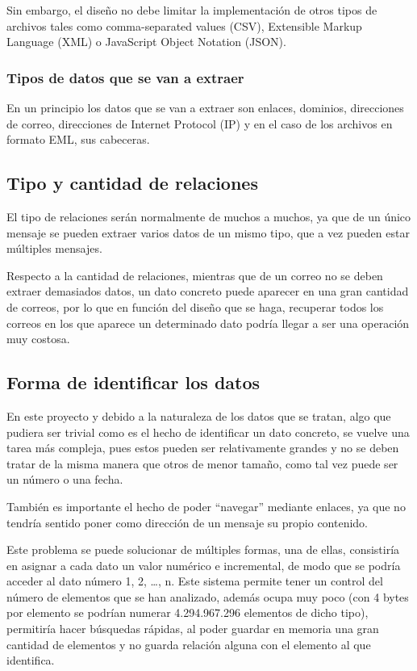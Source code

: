 Sin embargo, el diseño no debe limitar la implementación de otros tipos de archivos tales como comma-separated values (CSV), Extensible Markup Language (XML) o JavaScript Object Notation (JSON). 

\subsubsection{Tipos de datos que se van a extraer}
En un principio los datos que se van a extraer son enlaces, dominios, direcciones de correo, direcciones de Internet Protocol (IP) y en el caso de los archivos en formato EML, sus cabeceras. 

\subsection{Tipo y cantidad de relaciones}
El tipo de relaciones serán normalmente de muchos a muchos, ya que de un único mensaje se pueden extraer varios datos de un mismo tipo, que a vez pueden estar múltiples mensajes.

Respecto a la cantidad de relaciones, mientras que de un correo no se deben extraer demasiados datos, un dato concreto puede aparecer en una gran cantidad de correos, por lo que en función del diseño que se haga, recuperar todos los correos en los que aparece un determinado dato podría llegar a ser una operación muy costosa. 

\subsection{Forma de identificar los datos}
En este proyecto y debido a la naturaleza de los datos que se tratan, algo que pudiera ser trivial como es el hecho de identificar un dato concreto, se vuelve una tarea más compleja, pues estos pueden ser relativamente grandes y no se deben tratar de la misma manera que otros de menor tamaño, como tal vez puede ser un número o una fecha. 

También es importante el hecho de poder “navegar” mediante enlaces, ya que no tendría sentido poner como dirección de un mensaje su propio contenido.

Este problema se puede solucionar de múltiples formas, una de ellas, consistiría en asignar a cada dato un valor numérico e incremental, de modo que se podría acceder al dato número 1, 2, …, n. Este sistema permite tener un control del número de elementos que se han analizado, además ocupa muy poco (con 4 bytes por elemento se podrían numerar 4.294.967.296 elementos de dicho tipo), permitiría hacer búsquedas rápidas, al poder guardar en memoria una gran cantidad de elementos y no guarda relación alguna con el elemento al que identifica.

